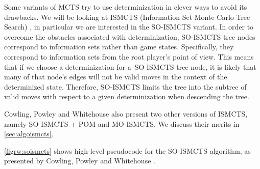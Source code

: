 Some variants of MCTS try to use determinization in clever ways to avoid its drawbacks.
We will be looking at ISMCTS (Information Set Monte Carlo Tree Search)
\cite{Cowling12}, in particular we are interested in the SO-ISMCTS variant.
In order to overcome the obstacles associated with determinization, SO-ISMCTS
tree nodes correspond to information sets rather than game states. Specifically,
they correspond to information sets from the root player's point of view. This
means that if we choose a determinization for a~SO-ISMCTS tree node, it is likely
that many of that node's edges will not be valid moves in the context
of the determinized state. Therefore, SO-ISMCTS limits the tree into the subtree
of valid moves with respect to a given determinization when descending the tree.

Cowling, Powley and Whitehouse \cite{Cowling12} also present two other versions
of ISMCTS, namely SO-ISMCTS + POM and MO-ISMCTS. We discuss their merits
in \autoref{sec:algoismcts}.


\autoref{figrw:soismcts} shows high-level pseudocode for the SO-ISMCTS algorithm,
as presented by Cowling, Powley and Whitehouse \cite{Cowling12}.

